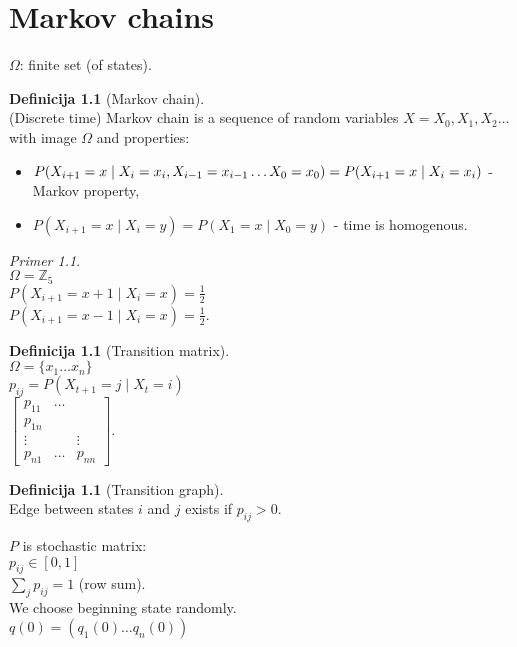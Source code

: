 \documentclass[a4paper, 12pt]{book}
\theoremstyle{definition}
\newtheorem{defn}[counter]{Definicija}
\theoremstyle{remark}
\newtheorem*{ex}{Primer}
\newcommand{\Z}{\mathbb{Z}}
\begin{document}
\chapter{Markov chains}


$\Omega$: finite set (of states).
\begin{defn}[Markov chain] \text{} \\
  (Discrete time) Markov chain is a sequence of random variables $X = X_0, X_1, X_2 \dots$ with image $\Omega$ and properties:
  \begin{itemize}
    \item $P(X_{i+1} = x \mid X_i = x_i, X_{i-1} = x_{i-1} \dots X_0 = x_0) =\\ P(X_{i+1} = x \mid X_i = x_i)$
      - Markov property,
    \item $P(X_{i+1} = x \mid X_i = y) = P(X_1 = x \mid X_0 = y)$ - time is homogenous.
  \end{itemize}
\end{defn}
\begin{ex} \text{} \\
  $\Omega = \Z_5$ \\
  $P(X_{i+1} = x+1 \mid X_i = x) = \frac{1}{2}$ \\
  $P(X_{i+1} = x-1 \mid X_i = x) = \frac{1}{2}$. \\
\end{ex}
\begin{defn}[Transition matrix] \text{} \\
  $\Omega = \{x_1 \dots x_n\}$ \\
  $p_{ij} = P(X_{t+1} = j \mid X_t = i)$ \\
  $\begin{bmatrix}
    p_{11} & \dots \\ p_{1n} \\
    \vdots & & \vdots \\
    p_{n1} & \dots & p_{nn}
  \end{bmatrix}$.
\end{defn}
\begin{defn}[Transition graph] \text{} \\ 
  Edge between states $i$ and $j$ exists if $p_{ij} > 0$.
\end{defn}
$P$ is stochastic matrix: \\
$p_{ij} \in [0,1]$ \\
$\sum_j p_{ij} = 1$ (row sum). \\
We choose beginning state randomly. \\
$q(0) = (q_1(0) \dots q_n(0))$ \\
\end{document}
